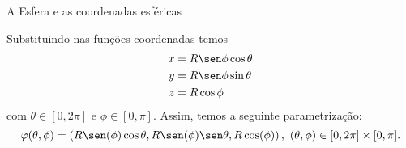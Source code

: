 \begin{example}{A Esfera e as coordenadas esféricas}{}
\begin{center}
\begin{comment}
  
  
		\draw[-latex] (0,0,0) -- (0,0,2) node [above] {$z$};


\draw[green,very thick] (0,0,0)--(0.5,-0.5,{sqrt(1-2*(0.5)^2)})--(0,0,{sqrt(1-2*(0.5)^2)}) node[above, midway,rotate=10]{\footnotesize$\sqrt{R^2-z^2}$};

\draw[dashed,green](0,0,0)--(1/2,-1/2,0);

\tdplotdrawarc[red,thick]{(0,0,0)}{0.25}{0}{310}{anchor=south west,inner sep=1}{$\theta$};


\draw[green!140] plot[domain=pi/3.25:pi/2,smooth,variable=\t] ({1/4*cos(\t r)},{-1/4*cos(\t r)},{1/4*sin(\t r)})node[anchor=south east,inner sep=0]{\footnotesize $\phi~~~$};





		\foreach \altura in {0.0125,0.025,...,1.0}{
			\pgfmathparse{sqrt(1-\altura^2)}
			\pgfmathsetmacro{\radio}{\pgfmathresult}
			\draw[blue!50,opacity=0.5] plot[domain=\tfin:\tend,smooth,variable=\t] ({\radio*cos(\t r)},{\radio*sin(\t r)},{\altura}); 
		}







    
\draw[dashed,gray!50] (0.5,-0.5,0) -- (0.5,-0.5,{2*(0.5)^2});
\draw[dashed,gray!50] (0.5,0,0) -- (0.5,-0.5,0)--(0,-0.5,0);


\draw[red!140] plot[domain=-pi/2:3*pi/4,smooth,variable=\t] ({sqrt(1-(sqrt(2)/2)^2) * cos(\t r)},{sqrt(1-(sqrt(2)/2)^2) * sin(\t r)},{sqrt(2)/2}); 





\filldraw[red!150] (0.5,-0.5,{sqrt(1-2*(0.5)^2)}) circle (1pt) 
node[left]{\footnotesize$\left(x_0,y_0,z_0\right)$};

\end{tikzpicture}\end{comment}
\end{center}
Substituindo nas funções coordenadas temos
\begin{align*}
x &= R\sen \phi \cos\theta \\
y &= R\sen \phi \sin\theta \\
z &= R\cos \phi 
\end{align*}
com $\theta\in[0,2\pi]$ e $\phi\in[0,\pi] $. 
Assim, temos a seguinte parametrização:
\[
\varphi(\theta, \phi) = \left(R\sen(\phi)\cos\theta, R\sen(\phi)\sen\theta, R\cos(\phi)\right), \  (\theta, \phi) \in [0, 2\pi] \times [0, \pi].
\]



\end{example}
